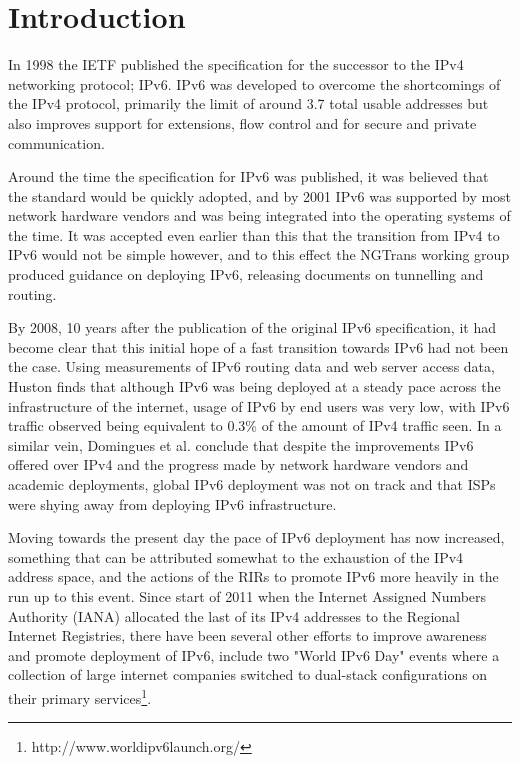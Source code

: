 \section{Introduction}

In 1998 the IETF published the specification for the successor to the IPv4
networking protocol; IPv6. IPv6 was developed to overcome the shortcomings
of the IPv4 protocol, primarily the limit of around 3.7 total usable
addresses\cite{beijnum_ip_2013} but also improves support for extensions, flow
control and for secure and private communication\cite{rfc2460}.

Around the time the specification for IPv6 was published, it was believed that
the standard would be quickly adopted, and by 2001 IPv6 was supported by most
network hardware vendors and was being integrated into the operating systems of
the time\cite{huang_ipv6_2000}\cite{durand_deploying_2001}. It was accepted even
earlier than this that
the transition from IPv4 to IPv6 would not be simple however, and to this effect
the NGTrans working group produced guidance on deploying IPv6, releasing
documents on tunnelling\cite{rfc1933}\cite{rfc2893} and routing\cite{rfc2185}. 

By 2008, 10 years after the publication of the original IPv6
specification, it had become clear that this initial hope of a fast
transition towards IPv6 had not been the case. Using measurements of IPv6 routing
data and web server access data, Huston finds that although IPv6 was being
deployed at a steady pace across the infrastructure of the internet, usage of
IPv6 by end users was very low, with IPv6 traffic observed being equivalent to
0.3\% of the amount of IPv4 traffic seen\cite{huston_ipv6_2008}. In a similar vein, Domingues 
et al. conclude that despite the improvements IPv6 offered over IPv4
and the progress made by network hardware vendors and academic deployments,
global IPv6 deployment was not on track and that ISPs were shying away from
deploying IPv6 infrastructure\cite{domingues_is_2007}.

Moving towards the present day the pace of IPv6 deployment has now increased,
something that can be attributed somewhat to the exhaustion of the IPv4 address
space, and the actions of the RIRs to promote IPv6 more heavily in the run up to
this event. Since start of 2011 when the Internet Assigned Numbers Authority (IANA)
allocated the last of its IPv4 addresses to the Regional Internet Registries,
there have been several other efforts to improve awareness and promote
deployment of IPv6, include two "World IPv6 Day" events where a collection of
large internet companies switched to dual-stack configurations on their primary
services\footnote[1]{http://www.worldipv6launch.org/}.

